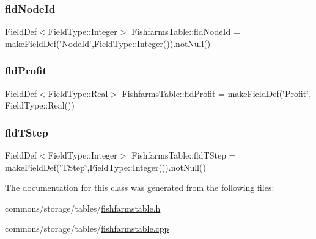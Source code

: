 \mbox{\label{class_fishfarms_table_acd269930a658c29defa28034644fe9c3}} 
\subsubsection{\texorpdfstring{fldNodeId}{fldNodeId}}
{\footnotesize\ttfamily Field\+Def$<$Field\+Type\+::\+Integer$>$ Fishfarms\+Table\+::fld\+Node\+Id = make\+Field\+Def(\char`\"{}Node\+Id\char`\"{},Field\+Type\+::\+Integer()).not\+Null()}

\mbox{\label{class_fishfarms_table_a6c476e6f46c61cd32e233f56f91d3a6f}} 
\subsubsection{\texorpdfstring{fldProfit}{fldProfit}}
{\footnotesize\ttfamily Field\+Def$<$Field\+Type\+::\+Real$>$ Fishfarms\+Table\+::fld\+Profit = make\+Field\+Def(\char`\"{}Profit\char`\"{}, Field\+Type\+::\+Real())}

\mbox{\label{class_fishfarms_table_a4e0a1838b9ee11546ce3826e3ecc1ebd}} 
\subsubsection{\texorpdfstring{fldTStep}{fldTStep}}
{\footnotesize\ttfamily Field\+Def$<$Field\+Type\+::\+Integer$>$ Fishfarms\+Table\+::fld\+T\+Step = make\+Field\+Def(\char`\"{}T\+Step\char`\"{},Field\+Type\+::\+Integer()).not\+Null()}



The documentation for this class was generated from the following files\+:\begin{DoxyCompactItemize}
\item 
commons/storage/tables/\mbox{\hyperlink{fishfarmstable_8h}{fishfarmstable.\+h}}\item 
commons/storage/tables/\mbox{\hyperlink{fishfarmstable_8cpp}{fishfarmstable.\+cpp}}\end{DoxyCompactItemize}
